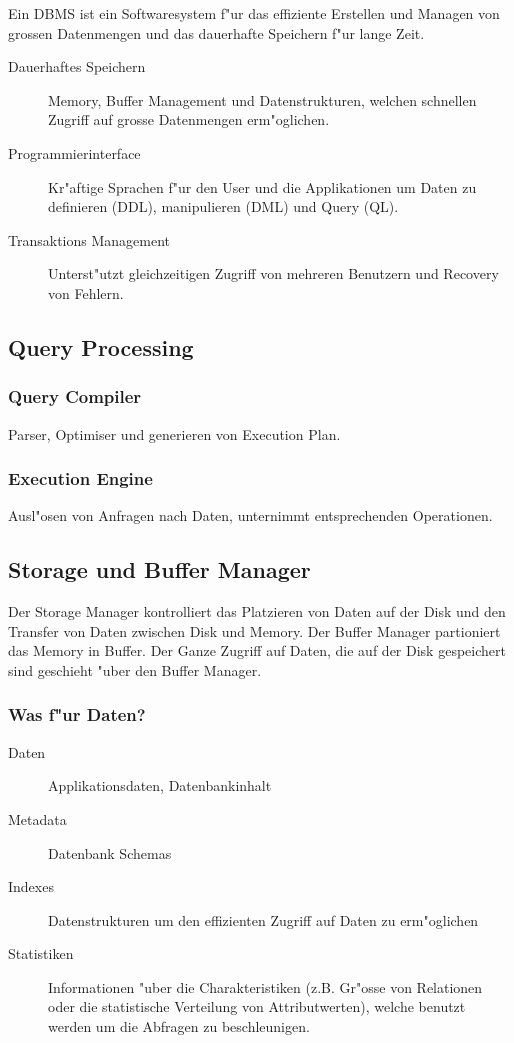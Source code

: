 \documentclass[german, 10pt, a4paper, twocolumn]{scrartcl}
\theoremstyle{definition}
\theoremstyle{remark}
\theoremstyle{example}
\begin{document}
Ein DBMS ist ein Softwaresystem f"ur das effiziente Erstellen und Managen von grossen Datenmengen und das dauerhafte Speichern f"ur lange Zeit.

\begin{description}
	\item[Dauerhaftes Speichern] Memory, Buffer Management und Datenstrukturen, welchen schnellen Zugriff auf grosse Datenmengen erm"oglichen.
	\item[Programmierinterface] Kr"aftige Sprachen f"ur den User und die Applikationen um Daten zu definieren (DDL), manipulieren (DML) und Query (QL).
	\item[Transaktions Management] Unterst"utzt gleichzeitigen Zugriff von mehreren Benutzern und Recovery von Fehlern.
\end{description}

\subsection{Query Processing}

\subsubsection{Query Compiler}

Parser, Optimiser und generieren von Execution Plan.

\subsubsection{Execution Engine}

Ausl"osen von Anfragen nach Daten, unternimmt entsprechenden Operationen.

\subsection{Storage und Buffer Manager}

Der Storage Manager kontrolliert das Platzieren von Daten auf der Disk und den Transfer von Daten zwischen Disk und Memory. Der Buffer Manager partioniert das Memory in Buffer. Der Ganze Zugriff auf Daten, die auf der Disk gespeichert sind geschieht "uber den Buffer Manager.

\subsubsection{Was f"ur Daten?}

\begin{description}
	\item[Daten] Applikationsdaten, Datenbankinhalt
	\item[Metadata] Datenbank Schemas
	\item[Indexes] Datenstrukturen um den effizienten Zugriff auf Daten zu erm"oglichen
	\item[Statistiken] Informationen "uber die Charakteristiken (z.B. Gr"osse von Relationen oder die statistische Verteilung von Attributwerten), welche benutzt werden um die Abfragen zu beschleunigen.
\end{description}
\end{document}
